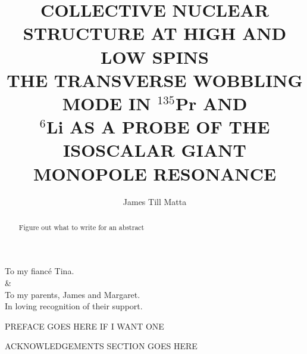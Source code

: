 \documentclass[final,numrefs,sort&compress]{nddiss2e}
\newcommand{\pr}{$^{135}$Pr}
\newcommand{\li}{$^{6}$Li}
\begin{document}
\frontmatter 
\title{COLLECTIVE NUCLEAR STRUCTURE AT HIGH AND LOW SPINS\\
THE TRANSVERSE WOBBLING MODE IN \pr{} AND \\
\li{} AS A PROBE OF THE ISOSCALAR GIANT MONOPOLE RESONANCE}
\author{James Till Matta}

\maketitle
%
%

\makecopyright

\begin{abstract}
  Figure out what to write for an abstract
\end{abstract}

\renewcommand{\dedicationname}{DEDICATED TO:}

\begin{dedication}
	To my fianc\'e Tina. \\\&\\To my parents, James and Margaret.\\
	In loving recognition of their support.
\end{dedication}

\tableofcontents
\listoffigures
\listoftables

\begin{preface}
  PREFACE GOES HERE IF I WANT ONE
\end{preface}

\begin{acknowledge}
  ACKNOWLEDGEMENTS SECTION GOES HERE
\end{acknowledge}

\begin{symbols}

\end{symbols}
\end{document}
